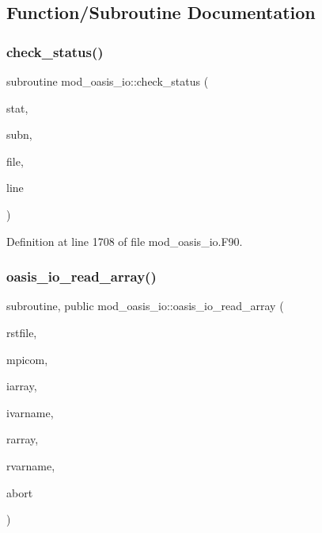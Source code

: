 \subsection{Function/\+Subroutine Documentation}
\mbox{\label{namespacemod__oasis__io_ab82165daa65fd85a13d8fe5ec9e2293e}} 
\subsubsection{\texorpdfstring{check\+\_\+status()}{check\_status()}}
{\footnotesize\ttfamily subroutine mod\+\_\+oasis\+\_\+io\+::check\+\_\+status (\begin{DoxyParamCaption}\item[{integer(ip\+\_\+i4\+\_\+p), intent(in)}]{stat,  }\item[{character(len=$\ast$), intent(in)}]{subn,  }\item[{character(len=$\ast$), intent(in)}]{file,  }\item[{integer(ip\+\_\+i4\+\_\+p), intent(in)}]{line }\end{DoxyParamCaption})\hspace{0.3cm}{\ttfamily [private]}}



Definition at line 1708 of file mod\+\_\+oasis\+\_\+io.\+F90.

\mbox{\label{namespacemod__oasis__io_a8b604f89345d74c74c6bc3b4760b2e29}} 
\subsubsection{\texorpdfstring{oasis\+\_\+io\+\_\+read\+\_\+array()}{oasis\_io\_read\_array()}}
{\footnotesize\ttfamily subroutine, public mod\+\_\+oasis\+\_\+io\+::oasis\+\_\+io\+\_\+read\+\_\+array (\begin{DoxyParamCaption}\item[{character(len=$\ast$), intent(in)}]{rstfile,  }\item[{integer(ip\+\_\+i4\+\_\+p), intent(in)}]{mpicom,  }\item[{integer(ip\+\_\+i4\+\_\+p), dimension(\+:), intent(inout), optional}]{iarray,  }\item[{character(len=$\ast$), intent(in), optional}]{ivarname,  }\item[{real(ip\+\_\+double\+\_\+p), dimension(\+:), intent(inout), optional}]{rarray,  }\item[{character(len=$\ast$), intent(in), optional}]{rvarname,  }\item[{logical, intent(in), optional}]{abort }\end{DoxyParamCaption})}



